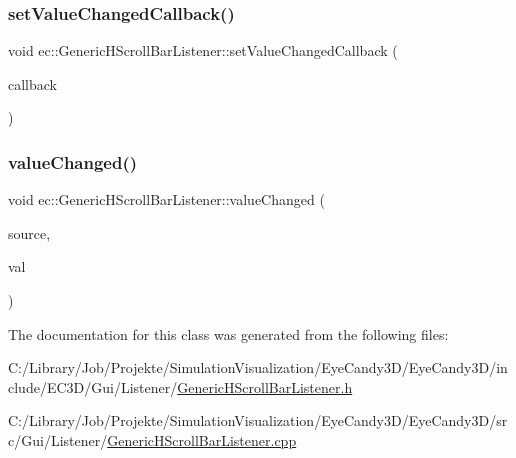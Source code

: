 \subsubsection{\texorpdfstring{set\+Value\+Changed\+Callback()}{setValueChangedCallback()}}
{\footnotesize\ttfamily void ec\+::\+Generic\+H\+Scroll\+Bar\+Listener\+::set\+Value\+Changed\+Callback (\begin{DoxyParamCaption}\item[{const \mbox{\hyperlink{classec_1_1_generic_h_scroll_bar_listener_ad02a375c4835a99a41bcd97b6a408637}{Value\+Changed\+\_\+\+Callback}} \&}]{callback }\end{DoxyParamCaption})}

\mbox{\label{classec_1_1_generic_h_scroll_bar_listener_a7c55d42a9623801361988a153d5d2d6d}} 
\subsubsection{\texorpdfstring{value\+Changed()}{valueChanged()}}
{\footnotesize\ttfamily void ec\+::\+Generic\+H\+Scroll\+Bar\+Listener\+::value\+Changed (\begin{DoxyParamCaption}\item[{agui\+::\+H\+Scroll\+Bar $\ast$}]{source,  }\item[{int}]{val }\end{DoxyParamCaption})\hspace{0.3cm}{\ttfamily [override]}}



The documentation for this class was generated from the following files\+:\begin{DoxyCompactItemize}
\item 
C\+:/\+Library/\+Job/\+Projekte/\+Simulation\+Visualization/\+Eye\+Candy3\+D/\+Eye\+Candy3\+D/include/\+E\+C3\+D/\+Gui/\+Listener/\mbox{\hyperlink{_generic_h_scroll_bar_listener_8h}{Generic\+H\+Scroll\+Bar\+Listener.\+h}}\item 
C\+:/\+Library/\+Job/\+Projekte/\+Simulation\+Visualization/\+Eye\+Candy3\+D/\+Eye\+Candy3\+D/src/\+Gui/\+Listener/\mbox{\hyperlink{_generic_h_scroll_bar_listener_8cpp}{Generic\+H\+Scroll\+Bar\+Listener.\+cpp}}\end{DoxyCompactItemize}
